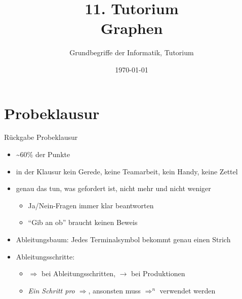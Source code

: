 




\title[Graphen]{11. Tutorium\\ Graphen}
\subtitle{Grundbegriffe der Informatik, Tutorium \hashtag\mytutnumber}
\date{\today}

\usetikzlibrary{matrix}
\usetikzlibrary{arrows.meta}
\usetikzlibrary{automata}
\usetikzlibrary{tikzmark}


\titleframe
\roadmap


\section{Probeklausur}
\begin{frame}{Rückgabe Probeklausur}
	\begin{itemize}
		\item \textasciitilde 60\% der Punkte
		\item in der Klausur \textcolor{kit-red100}{kein Gerede, keine Teamarbeit, kein Handy, keine Zettel}
		\item genau das tun, was gefordert ist, nicht mehr und nicht weniger
		\begin{itemize}
			\item Ja/Nein-Fragen immer klar beantworten
			\item \enquote{Gib an ob} braucht keinen Beweis
		\end{itemize}
		\item Ableitungsbaum: Jedes Terminalsymbol bekommt genau einen Strich
		\item Ableitungsschritte:
		\begin{itemize}
			\item $\Rightarrow$ bei Ableitungsschritten, $\rightarrow$ bei Produktionen
			\item \emph{Ein Schritt pro $\Rightarrow$}, ansonsten muss $\Rightarrow^n$ verwendet werden
		\end{itemize}
	\end{itemize}
	
\end{frame}





